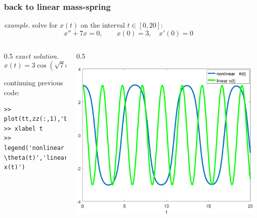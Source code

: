 \documentclass[urlcolor=blue,dvipsnames]{beamer}
\begin{document}
\begin{frame}[fragile]
\frametitle{back to linear mass-spring}

\small

\noindent \hspace{-4mm} \emph{example}.  solve for $x(t)$ on the interval $t\in [0,20]$:
    $$x''+ 7 x = 0, \qquad x(0)=3, \quad x'(0)=0$$

\begin{columns}
\begin{column}{0.5\textwidth}
\noindent \emph{exact solution.}
    $$x(t)=3 \cos(\sqrt{7} t)$$

\vspace{28mm}
continuing previous code:
\begin{Verbatim}[fontsize=\footnotesize]
>> plot(tt,zz(:,1),'b',tt,3*cos(sqrt(7)*tt),'g')
>> xlabel t
>> legend('nonlinear \theta(t)','linear x(t)')
\end{Verbatim}
\end{column}
\begin{column}{0.5\textwidth}

\vspace{-10mm}
\includegraphics[width=1.0\textwidth]{figs/pend-compare}
\end{column}
\end{columns}
\end{frame}
\end{document}
